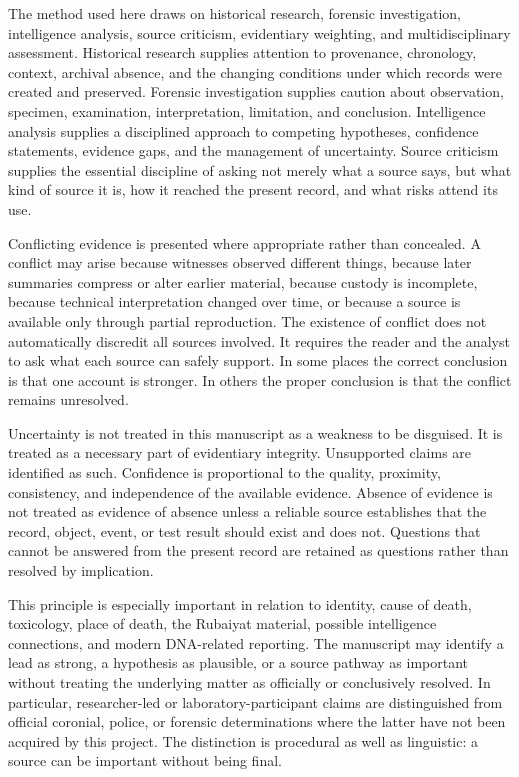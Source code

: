 The method used here draws on historical research, forensic investigation, intelligence analysis, source criticism, evidentiary weighting, and multidisciplinary assessment. Historical research supplies attention to provenance, chronology, context, archival absence, and the changing conditions under which records were created and preserved. Forensic investigation supplies caution about observation, specimen, examination, interpretation, limitation, and conclusion. Intelligence analysis supplies a disciplined approach to competing hypotheses, confidence statements, evidence gaps, and the management of uncertainty. Source criticism supplies the essential discipline of asking not merely what a source says, but what kind of source it is, how it reached the present record, and what risks attend its use.

Conflicting evidence is presented where appropriate rather than concealed. A conflict may arise because witnesses observed different things, because later summaries compress or alter earlier material, because custody is incomplete, because technical interpretation changed over time, or because a source is available only through partial reproduction. The existence of conflict does not automatically discredit all sources involved. It requires the reader and the analyst to ask what each source can safely support. In some places the correct conclusion is that one account is stronger. In others the proper conclusion is that the conflict remains unresolved.

Uncertainty is not treated in this manuscript as a weakness to be disguised. It is treated as a necessary part of evidentiary integrity. Unsupported claims are identified as such. Confidence is proportional to the quality, proximity, consistency, and independence of the available evidence. Absence of evidence is not treated as evidence of absence unless a reliable source establishes that the record, object, event, or test result should exist and does not. Questions that cannot be answered from the present record are retained as questions rather than resolved by implication.

This principle is especially important in relation to identity, cause of death, toxicology, place of death, the Rubaiyat material, possible intelligence connections, and modern DNA-related reporting. The manuscript may identify a lead as strong, a hypothesis as plausible, or a source pathway as important without treating the underlying matter as officially or conclusively resolved. In particular, researcher-led or laboratory-participant claims are distinguished from official coronial, police, or forensic determinations where the latter have not been acquired by this project. The distinction is procedural as well as linguistic: a source can be important without being final.


